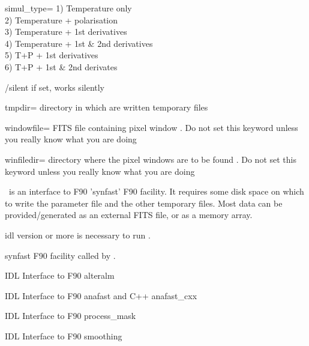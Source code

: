 \begin{keywords}
\begin{kwlist}{}
 \item[simul\_type=] 
        1) Temperature only \\
        2) Temperature + polarisation \\
        3) Temperature + 1st derivatives \\
        4) Temperature + 1st \& 2nd derivatives \\
        5) T+P + 1st derivatives \\
        6) T+P + 1st \& 2nd derivates

 \item[/silent]    if set, works silently

 \item[tmpdir=]      directory in which are written temporary files 

 \item[windowfile=]    FITS file containing pixel window 
        .
      Do not set this keyword unless you really know what you are doing

  \item[winfiledir=]     directory where the pixel windows are to be found 
        .
      Do not set this keyword unless you really know what you are doing

  \end{kwlist}
\end{keywords}  

\begin{codedescription}
{\thedocid\ is an interface to F90 'synfast' F90 facility. It
requires some disk space on which to write the parameter file and the other
temporary files. Most data can be provided/generated as an external FITS
file, or as a memory array.}
\end{codedescription}



\begin{related}
  \begin{sulist}{} %
    \item[idl] version \idlversion or more is necessary to run \thedocid.
    \item[synfast] F90 facility called by \thedocid.
    \item[\htmlref{ialteralm}{idl:ialteralm}] IDL Interface to F90 alteralm
    \item[\htmlref{ianafast}{idl:ianafast}] IDL Interface to F90 anafast and C++ anafast\_cxx
    \item[\htmlref{iprocess\_mask}{idl:iprocess_mask}] IDL Interface to F90 process\_mask
    \item[\htmlref{ismoothing}{idl:ismoothing}] IDL Interface to F90 smoothing 
 \end{sulist}
\end{related}

